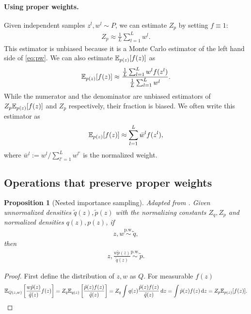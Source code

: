 \documentclass{article}
\newtheorem{proposition}{Proposition}
\theoremstyle{definition}
\newcommand{\pw}{\overset{\text{p.w.}}{\sim}
}
\begin{document}
\paragraph{Using proper weights.}
Given independent samples $z^l, w^l \sim P$, we can estimate $Z_p$ by setting $f \equiv 1$:
\begin{align*}
    Z_p \approx \frac{1}{L} \sum_{l = 1}^L w^l.
\end{align*}
This estimator is unbiased because it is a Monte Carlo estimator of the left hand side of \eqref{eq:pw}.
We can also estimate $\mathbb{E}_{p(z)}[f(z)]$ as
\begin{align*}
    \mathbb{E}_{p(z)}[f(z)] \approx \frac{\frac{1}{L} \sum_{l = 1}^L w^l f(z^l)}{\frac{1}{L} \sum_{l = 1}^L w^l}.
\end{align*}
While the numerator and the denominator are unbiased estimators of $Z_p \mathbb{E}_{p(z)}[f(z)]$ and $Z_p$ respectively, their fraction is biased.
We often write this estimator as
\begin{align}
    \mathbb{E}_{p(z)}[f(z)] \approx \sum_{l = 1}^L \bar w^l f(z^l), \label{eq:pw-estimation}
\end{align}
where $\bar w^l := w^l / \sum_{l' = 1}^L w^{l'}$ is the normalized weight.

\subsection{Operations that preserve proper weights}


\begin{proposition}[Nested importance sampling]
    Adapted from \cite[Algorithm 1]{naesseth2015nested}.
    Given unnormalized densities $\tilde q(z), \tilde p(z)$ with the normalizing constants $Z_q, Z_p$ and normalized densities $q(z), p(z)$, if 
    \begin{align}
        z, w \pw \tilde q, \label{eq:1}
    \end{align}
    then
    \begin{align*}
        z, \frac{w\tilde p(z)}{\tilde q(z)} \pw \tilde p.
    \end{align*}
\end{proposition}
\begin{proof}
    First define the distribution of $z, w$ as $Q$.
    For measurable $f(z)$
    \begin{align*}
        \mathbb{E}_{Q(z, w)}\left[\frac{w\tilde p(z)}{\tilde q(z)} f(z)\right] 
        = Z_q \mathbb{E}_{q(z)}\left[\frac{\tilde p(z) f(z)}{\tilde q(z)}\right]
        = Z_q \int q(z) \frac{\tilde p(z) f(z)}{\tilde q(z)} \,\mathrm dz
        = \int \tilde p\textbf{}(z) f(z) \,\mathrm dz
        = Z_p \mathbb{E}_{p(z)}[f(z)].
    \end{align*}
\end{proof}
\end{document}
